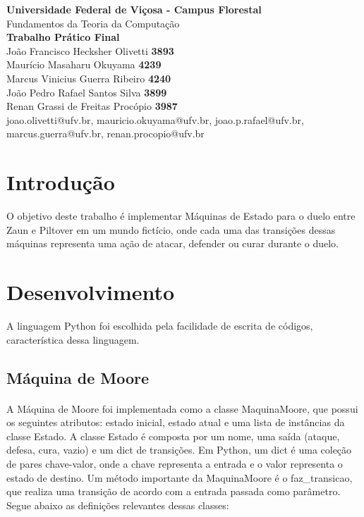 \documentclass[12pt]{article}
\begin{document}
    \begin{titlepage}
    \begin{center}
        {\LARGE \textbf{Universidade Federal de Viçosa - Campus Florestal}}\\
        \vspace{4cm}
        Fundamentos da Teoria da Computação\\
        \vspace{4cm}
        {\LARGE\textbf{Trabalho Prático Final}}\\
        \vspace{4cm}
        João Francisco Hecksher Olivetti \textbf{3893} \\ Maurício Masaharu Okuyama \textbf{4239} \\ 
        Marcus Vinicius Guerra Ribeiro \textbf{4240} \\
        João Pedro Rafael Santos Silva \textbf{3899} \\ Renan Grassi de Freitas Procópio \textbf{3987} \\
        joao.olivetti@ufv.br, mauricio.okuyama@ufv.br, joao.p.rafael@ufv.br, marcus.guerra@ufv.br, renan.procopio@ufv.br\\ 

    \end{center}
    \end{titlepage}

\newpage
\tableofcontents
\newpage

\section{Introdução}
O objetivo deste trabalho é implementar Máquinas de Estado para o duelo entre Zaun e Piltover em um mundo fictício, onde cada uma das transições dessas máquinas representa uma ação de atacar, defender ou curar durante o duelo.

\section{Desenvolvimento}
A linguagem Python foi escolhida pela facilidade de escrita de códigos, característica dessa linguagem.

\subsection{Máquina de Moore}
\paragraph{}A Máquina de Moore foi implementada como a classe MaquinaMoore, que possui os seguintes atributos: estado inicial, estado atual e uma lista de instâncias da classe Estado. A classe Estado é composta por um nome, uma saída (ataque, defesa, cura, vazio) e um dict de transições. Em Python, um dict é uma coleção de pares chave-valor, onde a chave representa a entrada e o valor representa o estado de destino.
Um método importante da MaquinaMoore é o faz\_transicao, que realiza uma transição de acordo com a entrada passada como parâmetro. Segue abaixo as definições relevantes dessas classes: 
\end{document}

